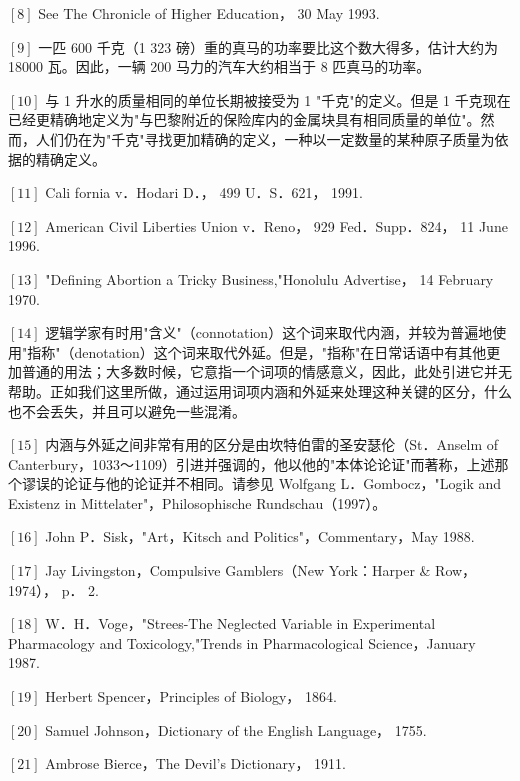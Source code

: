 $[8]$ See The Chronicle of Higher Education， 30 May 1993.

$[9]$ 一匹 600 千克（1 323 磅）重的真马的功率要比这个数大得多，估计大约为 18000 瓦。因此，一辆 200 马力的汽车大约相当于 8 匹真马的功率。

$[10]$ 与 1 升水的质量相同的单位长期被接受为 1 "千克"的定义。但是 1 千克现在已经更精确地定义为"与巴黎附近的保险库内的金属块具有相同质量的单位"。然而，人们仍在为"千克"寻找更加精确的定义，一种以一定数量的某种原子质量为依据的精确定义。

$[11]$ Cali fornia v．Hodari D．， 499 U．S．621， 1991.

$[12]$ American Civil Liberties Union v．Reno， 929 Fed．Supp．824， 11 June 1996.

$[13]$ "Defining Abortion a Tricky Business,"Honolulu Advertise， 14 February 1970.

$[14]$ 逻辑学家有时用"含义"（connotation）这个词来取代内涵，并较为普遍地使用"指称"（denotation）这个词来取代外延。但是，"指称"在日常话语中有其他更加普通的用法；大多数时候，它意指一个词项的情感意义，因此，此处引进它并无帮助。正如我们这里所做，通过运用词项内涵和外延来处理这种关键的区分，什么也不会丢失，并且可以避免一些混淆。

$[15]$ 内涵与外延之间非常有用的区分是由坎特伯雷的圣安瑟伦（St．Anselm of Canterbury，1033～1109）引进并强调的，他以他的"本体论论证"而著称，上述那个谬误的论证与他的论证并不相同。请参见 Wolfgang L．Gombocz，"Logik and Existenz in Mittelater"，Philosophische Rundschau（1997）。

$[16]$ John P．Sisk，"Art，Kitsch and Politics"，Commentary，May 1988.

$[17]$ Jay Livingston，Compulsive Gamblers（New York：Harper \& Row，1974）， p． 2.

$[18]$ W．H．Voge，"Strees-The Neglected Variable in Experimental Pharmacology and Toxicology,"Trends in Pharmacological Science，January 1987.

$[19]$ Herbert Spencer，Principles of Biology， 1864.

$[20]$ Samuel Johnson，Dictionary of the English Language， 1755.

$[21]$ Ambrose Bierce，The Devil's Dictionary， 1911. 